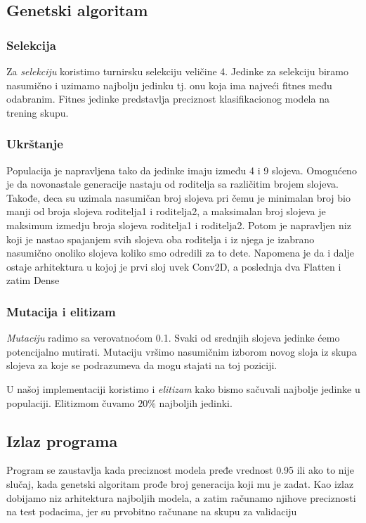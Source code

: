 \documentclass{article}
\begin{document}
\subsection{Genetski algoritam}

\subsubsection{Selekcija}
Za \textit{selekciju} koristimo turnirsku selekciju veličine 4. Jedinke za selekciju biramo nasumično i uzimamo najbolju jedinku tj. onu koja ima najveći fitnes među odabranim. Fitnes jedinke predstavlja preciznost klasifikacionog modela na trening skupu.  \
\subsubsection{Ukrštanje}
Populacija je napravljena tako da jedinke imaju između 4 i 9 slojeva. Omogućeno je da novonastale generacije nastaju od roditelja sa različitim brojem slojeva. Takođe, deca su uzimala nasumičan broj slojeva pri čemu je minimalan broj bio manji od broja slojeva roditelja1 i roditelja2, a maksimalan broj slojeva je maksimum izmedju broja slojeva roditelja1 i roditelja2.
Potom je napravljen niz koji je nastao spajanjem svih slojeva oba roditelja i iz njega je izabrano nasumično onoliko slojeva koliko smo odredili za to dete. Napomena je da i dalje ostaje arhitektura u kojoj je prvi sloj uvek Conv2D, a poslednja dva Flatten i zatim Dense
\subsubsection{Mutacija i elitizam}
\textit{Mutaciju} radimo sa verovatnoćom 0.1. Svaki od srednjih slojeva jedinke ćemo potencijalno mutirati. Mutaciju vršimo nasumičnim izborom novog sloja iz skupa slojeva za koje se podrazumeva da mogu stajati na toj poziciji.

\hspace{1mm}U našoj implementaciji koristimo i \textit{elitizam} kako bismo sačuvali najbolje jedinke u populaciji. Elitizmom čuvamo $20\%$ najboljih jedinki.



\subsection{Izlaz programa}
Program se zaustavlja kada preciznost modela pređe vrednost 0.95 ili ako to nije slučaj, kada genetski algoritam prođe broj generacija koji mu je zadat. Kao izlaz dobijamo niz arhitektura najboljih modela, a zatim računamo njihove preciznosti na test podacima, jer su prvobitno računane na skupu za validaciju
\end{document}
